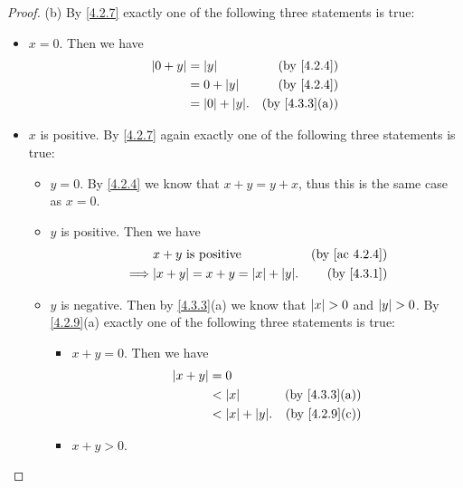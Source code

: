 \begin{proof}{(b)}
  By \cref{4.2.7} exactly one of the following three statements is true:
  \begin{itemize}
    \item \(x = 0\).
          Then we have
          \begin{align*}
            \abs{0 + y} & = \abs{y}            & \text{(by \cref{4.2.4})}    \\
                        & = 0 + \abs{y}        & \text{(by \cref{4.2.4})}    \\
                        & = \abs{0} + \abs{y}. & \text{(by \cref{4.3.3}(a))}
          \end{align*}
    \item \(x\) is positive.
          By \cref{4.2.7} again exactly one of the following three statements is true:
          \begin{itemize}
            \item \(y = 0\).
                  By \cref{4.2.4} we know that \(x + y = y + x\), thus this is the same case as \(x = 0\).
            \item \(y\) is positive.
                  Then we have
                  \begin{align*}
                             & x + y \text{ is positive}                & \text{(by \cref{ac 4.2.4})} \\
                    \implies & \abs{x + y} = x + y = \abs{x} + \abs{y}. & \text{(by \cref{4.3.1})}
                  \end{align*}
            \item \(y\) is negative.
                  Then by \cref{4.3.3}(a) we know that \(\left\lvert x\right\rvert > 0\) and \(\left\lvert y\right\rvert > 0\).
                  By \cref{4.2.9}(a) exactly one of the following three statements is true:
                  \begin{itemize}
                    \item \(x + y = 0\).
                          Then we have
                          \begin{align*}
                            \abs{x + y} & = 0                                                \\
                                        & < \abs{x}            & \text{(by \cref{4.3.3}(a))} \\
                                        & < \abs{x} + \abs{y}. & \text{(by \cref{4.2.9}(c))}
                          \end{align*}
                    \item \(x + y > 0\).

\end{itemize}
\end{itemize}
\end{itemize}
\end{proof}
